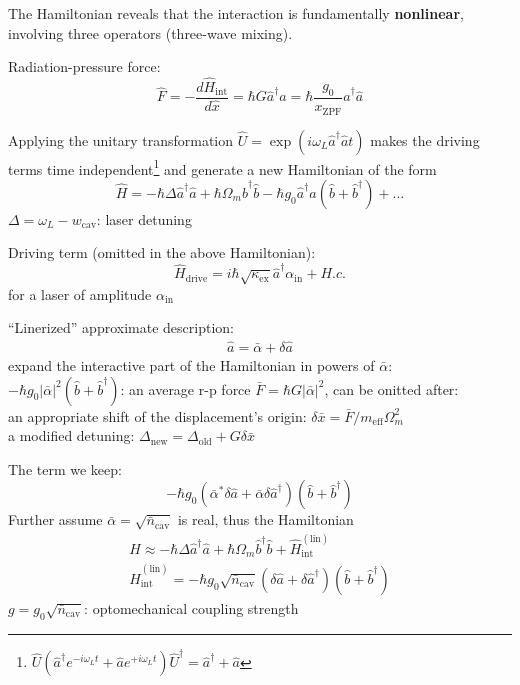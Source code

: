 \documentclass[8pt,a4paper,twocolumn]{article} %
\numberwithin{equation}{section} %
\begin{document}
			The Hamiltonian reveals that the interaction is fundamentally \textbf{nonlinear}, involving three operators (three-wave mixing).

			Radiation-pressure force:
			\begin{equation}
				\hat F=-\frac{d\hat H_{\text{int}}}{d\hat x}=\hbar G\hat a^{\dagger}\hat a=\hbar \frac{g_0}{x_{\text{ZPF}}} \hat a^{\dagger}\hat a
			\end{equation}

			Applying the unitary transformation $\hat U = \exp(i \omega_L \hat a ^{\dagger} \hat a t ) $ makes the driving terms time independent\footnote{ $\hat U ( \hat a^{\dagger} e^{-i \omega_L t} +\hat a e^{+i \omega_Lt} )\hat U^{\dagger}=\hat a^{\dagger}+\hat a $} and generate a new Hamiltonian of the form
			\begin{equation}
				\hat H=-\hbar \Delta \hat a^{\dagger}\hat a+\hbar \Omega_m \hat b^{\dagger} \hat b-\hbar g_0 \hat a^{\dagger} \hat a (\hat b + \hat b^{\dagger})+...
			\end{equation}
			$\Delta =\omega_L-w	_{\text{cav}} $: laser detuning

			Driving term (omitted in the above Hamiltonian):
			\begin{equation}
				\hat H_{\text{drive}}=i\hbar \sqrt{\kappa_{\text{ex}}} \hat a^{\dagger} \alpha_{\text{in}}+H.c.
			\end{equation}
			for a laser of amplitude $\alpha_{\text{in}} $

			``Linerized'' approximate description:
			\begin{gather}
				\hat a=\bar \alpha +\delta \hat a
			\end{gather}
			expand the interactive part of the Hamiltonian in powers of $\bar \alpha$:\\
			$ -\hbar g_0 |\bar \alpha|^2(\hat b + \hat b^{\dagger}) $: an average r-p force $ \bar F=\hbar G |\bar \alpha|^2 $, can be onitted after:\\
			an appropriate shift of the displacement's origin: $ \delta\bar x=\bar F/m_{\text{eff}}\Omega_m^2 $ \\
			a modified detuning: $ \Delta_{\text{new}} =\Delta_{\text{old}} +G \delta \bar x $

			The term we keep:
			\begin{equation}
				-\hbar g_0 ( \bar \alpha^* \delta\hat a+\bar \alpha \delta \hat a^{\dagger} )( \hat b+\hat b^{\dagger} )
			\end{equation}
			Further assume $\bar \alpha=\sqrt{\bar n_{\text{cav}}} $ is real, thus the Hamiltonian
			\begin{gather}
				\hat H\approx -\hbar \Delta \hat a^{\dagger}\hat a+\hbar \Omega_m \hat b^{\dagger} \hat b+\hat H_{\text{int}}^{(\text{lin})}\\
				\hat H_{\text{int}}^{(\text{lin})} = -\hbar g_0 \sqrt{\bar n_{\text{cav}}}( \delta\hat a+\delta \hat a^{\dagger} )( \hat b+\hat b^{\dagger} )
			\end{gather}
			$ g=g_0 \sqrt{\bar n_{\text{cav}}} $: optomechanical coupling strength
\end{document}

